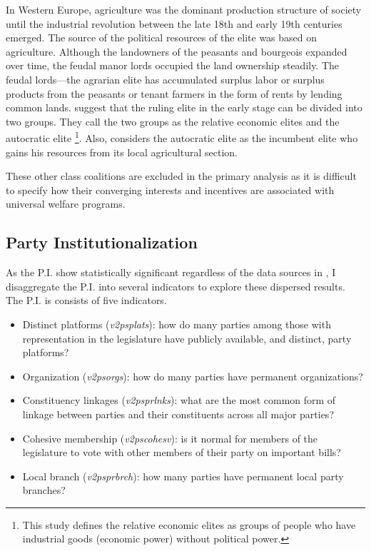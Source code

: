 \documentclass[12pt]{article}
\begin{document}
	In Western Europe, agriculture was the dominant production structure of society until the industrial revolution between the late 18th and early 19th centuries emerged. The source of the political resources of the elite was based on agriculture. Although the landowners of the peasants and bourgeois expanded over time, the feudal manor lords occupied the land ownership steadily. The feudal lords---the agrarian elite has accumulated surplus labor or surplus products from the peasants or tenant farmers in the form of rents by lending common lands. \citet{Ansell2015a} suggest that the ruling elite in the early stage can be divided into two groups. They call the two groups as the relative economic elites and the autocratic elite \footnote{This study defines the relative economic elites as groups of people who have industrial goods (economic power) without political power.}. Also, \citet{Ansell2015a} considers the autocratic elite as the incumbent elite who gains his resources from its local agricultural section.
	
	These other class coalitions are excluded in the primary analysis as it is difficult to specify how their converging interests and incentives are associated with universal welfare programs.
	
	\subsection{Party Institutionalization}
	
	As the P.I. show statistically significant regardless of the data sources in \citep{Rasmussen2019}, I disaggregate the P.I. into several indicators to explore these dispersed results. The P.I. is consists of five indicators.
	
	\begin{itemize}
		\item Distinct platforms (\textit{v2psplats}): how do many parties among those with representation in the legislature have publicly available, and distinct, party platforms?
		\item Organization (\textit{v2psorgs}): how do many parties have permanent organizations?
		\item Constituency linkages (\textit{v2psprlnks}): what are the most common form of linkage between parties and their constituents across all major parties?
		\item Cohesive membership (\textit{v2pscohesv}): is it normal for members of the legislature to vote with other members of their party on important bills?
		\item Local branch (\textit{v2psprbrch}): how many parties have permanent local party branches?
	\end{itemize}
	
\end{document}

